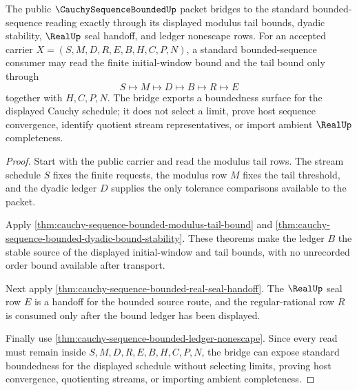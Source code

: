 \begin{theorem}\label{thm:cauchy-sequence-bounded-bridge-surface}
The public $\CauchySequenceBoundedUp$ packet bridges to the standard bounded-sequence reading exactly through its displayed modulus tail bounds, dyadic stability, $\RealUp$ seal handoff, and ledger nonescape rows. For an accepted carrier $X=(S,M,D,R,E,B,H,C,P,N)$, a standard bounded-sequence consumer may read the finite initial-window bound and the tail bound only through
$$
S\longmapsto M\longmapsto D\longmapsto B\longmapsto R\longmapsto E
$$
together with $H,C,P,N$. The bridge exports a boundedness surface for the displayed Cauchy schedule; it does not select a limit, prove host sequence convergence, identify quotient stream representatives, or import ambient $\RealUp$ completeness.
\end{theorem}
\begin{proof}
Start with the public carrier and read the modulus tail rows. The stream schedule $S$ fixes the finite requests, the modulus row $M$ fixes the tail threshold, and the dyadic ledger $D$ supplies the only tolerance comparisons available to the packet.

Apply \autoref{thm:cauchy-sequence-bounded-modulus-tail-bound} and \autoref{thm:cauchy-sequence-bounded-dyadic-bound-stability}. These theorems make the ledger $B$ the stable source of the displayed initial-window and tail bounds, with no unrecorded order bound available after transport.

Next apply \autoref{thm:cauchy-sequence-bounded-real-seal-handoff}. The $\RealUp$ seal row $E$ is a handoff for the bounded source route, and the regular-rational row $R$ is consumed only after the bound ledger has been displayed.

Finally use \autoref{thm:cauchy-sequence-bounded-ledger-nonescape}. Since every read must remain inside $S,M,D,R,E,B,H,C,P,N$, the bridge can expose standard boundedness for the displayed schedule without selecting limits, proving host convergence, quotienting streams, or importing ambient completeness.
\end{proof}


